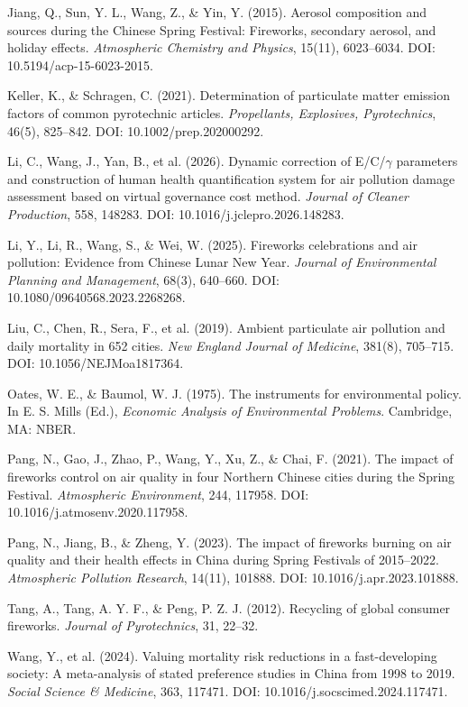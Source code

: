 \begin{list}{}{\setlength{\leftmargin}{2.2em}\setlength{\itemindent}{-2.2em}\setlength{\itemsep}{0.35em}\raggedright\sloppy}
\item Jiang, Q., Sun, Y. L., Wang, Z., \& Yin, Y. (2015). Aerosol composition and sources during the Chinese Spring Festival: Fireworks, secondary aerosol, and holiday effects. \emph{Atmospheric Chemistry and Physics}, 15(11), 6023--6034. DOI: 10.5194/acp-15-6023-2015.
\item Keller, K., \& Schragen, C. (2021). Determination of particulate matter emission factors of common pyrotechnic articles. \emph{Propellants, Explosives, Pyrotechnics}, 46(5), 825--842. DOI: 10.1002/prep.202000292.
\item Li, C., Wang, J., Yan, B., et al. (2026). Dynamic correction of E/C/$\gamma$ parameters and construction of human health quantification system for air pollution damage assessment based on virtual governance cost method. \emph{Journal of Cleaner Production}, 558, 148283. DOI: 10.1016/j.jclepro.2026.148283.
\item Li, Y., Li, R., Wang, S., \& Wei, W. (2025). Fireworks celebrations and air pollution: Evidence from Chinese Lunar New Year. \emph{Journal of Environmental Planning and Management}, 68(3), 640--660. DOI: 10.1080/09640568.2023.2268268.
\item Liu, C., Chen, R., Sera, F., et al. (2019). Ambient particulate air pollution and daily mortality in 652 cities. \emph{New England Journal of Medicine}, 381(8), 705--715. DOI: 10.1056/NEJMoa1817364.
\item Oates, W. E., \& Baumol, W. J. (1975). The instruments for environmental policy. In E. S. Mills (Ed.), \emph{Economic Analysis of Environmental Problems}. Cambridge, MA: NBER.
\item Pang, N., Gao, J., Zhao, P., Wang, Y., Xu, Z., \& Chai, F. (2021). The impact of fireworks control on air quality in four Northern Chinese cities during the Spring Festival. \emph{Atmospheric Environment}, 244, 117958. DOI: 10.1016/j.atmosenv.2020.117958.
\item Pang, N., Jiang, B., \& Zheng, Y. (2023). The impact of fireworks burning on air quality and their health effects in China during Spring Festivals of 2015--2022. \emph{Atmospheric Pollution Research}, 14(11), 101888. DOI: 10.1016/j.apr.2023.101888.
\item Tang, A., Tang, A. Y. F., \& Peng, P. Z. J. (2012). Recycling of global consumer fireworks. \emph{Journal of Pyrotechnics}, 31, 22--32.
\item Wang, Y., et al. (2024). Valuing mortality risk reductions in a fast-developing society: A meta-analysis of stated preference studies in China from 1998 to 2019. \emph{Social Science \& Medicine}, 363, 117471. DOI: 10.1016/j.socscimed.2024.117471.

\end{list}
